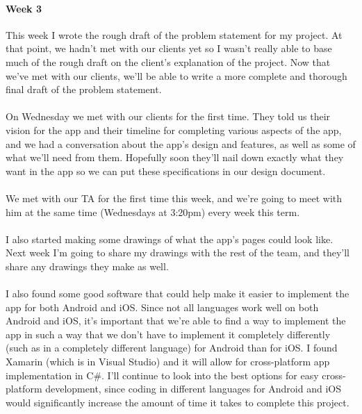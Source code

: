 \documentclass[onecolumn, draftclsnofoot,10pt, compsoc]{IEEEtran}
\begin{document}
      \paragraph{Week 3}
      This week I wrote the rough draft of the problem statement for my project. At that point, we hadn't met with our clients yet so I wasn't really able to base much of the rough draft on the client's explanation of the project. Now that we've met with our clients, we'll be able to write a more complete and thorough final draft of the problem statement. \\ \\
      On Wednesday we met with our clients for the first time. They told us their vision for the app and their timeline for completing various aspects of the app, and we had a conversation about the app's design and features, as well as some of what we'll need from them. Hopefully soon they'll nail down exactly what they want in the app so we can put these specifications in our design document. \\ \\
      We met with our TA for the first time this week, and we're going to meet with him at the same time (Wednesdays at 3:20pm) every week this term. \\ \\
      I also started making some drawings of what the app's pages could look like. Next week I'm going to share my drawings with the rest of the team, and they'll share any drawings they make as well. \\ \\
      I also found some good software that could help make it easier to implement the app for both Android and iOS. Since not all languages work well on both Android and iOS, it's important that we're able to find a way to implement the app in such a way that we don't have to implement it completely differently (such as in a completely different language) for Android than for iOS. I found Xamarin (which is in Visual Studio) and it will allow for cross-platform app implementation in C\#. I'll continue to look into the best options for easy cross-platform development, since coding in different languages for Android and iOS would significantly increase the amount of time it takes to complete this project. \\ \\
\end{document}
